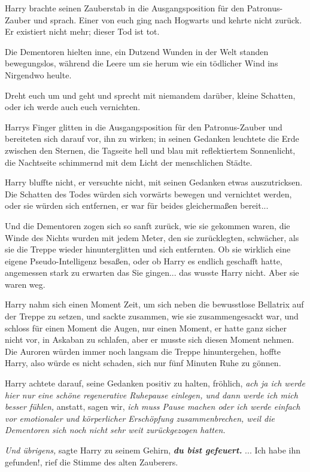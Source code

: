 Harry brachte seinen Zauberstab in die Ausgangsposition für den Patronus-Zauber
und sprach. \glqq{}Einer von euch ging nach Hogwarts und kehrte nicht zurück. Er
existiert nicht mehr; dieser Tod ist tot.\grqq{}

Die Dementoren hielten inne, ein Dutzend Wunden in der Welt standen
bewegungslos, während die Leere um sie herum wie ein tödlicher Wind ins
Nirgendwo heulte.

\glqq{}Dreht euch um und geht und sprecht mit niemandem darüber, kleine Schatten,
oder ich werde auch euch vernichten.\grqq{}

Harrys Finger glitten in die Ausgangsposition für den Patronus-Zauber und
bereiteten sich darauf vor, ihn zu wirken; in seinen Gedanken leuchtete die Erde
zwischen den Sternen, die Tagseite hell und blau mit reflektiertem Sonnenlicht,
die Nachtseite schimmernd mit dem Licht der menschlichen Städte.

Harry bluffte nicht, er versuchte nicht, mit seinen Gedanken etwas
auszutricksen. Die Schatten des Todes würden sich vorwärts bewegen und
vernichtet werden, oder sie würden sich entfernen, er war für beides
gleichermaßen bereit...

Und die Dementoren zogen sich so sanft zurück, wie sie gekommen waren, die Winde
des Nichts wurden mit jedem Meter, den sie zurücklegten, schwächer, als sie die
Treppe wieder hinunterglitten und sich entfernten. Ob sie wirklich eine eigene
Pseudo-Intelligenz besaßen, oder ob Harry es endlich geschafft hatte, angemessen
stark zu erwarten das Sie gingen... das wusste Harry nicht. Aber sie waren weg.

Harry nahm sich einen Moment Zeit, um sich neben die bewusstlose Bellatrix auf
der Treppe zu setzen, und sackte zusammen, wie sie zusammengesackt war, und
schloss für einen Moment die Augen, nur einen Moment, er hatte ganz sicher nicht
vor, in Askaban zu schlafen, aber er musste sich diesen Moment nehmen. Die
Auroren würden immer noch langsam die Treppe hinuntergehen, hoffte Harry, also
würde es nicht schaden, sich nur fünf Minuten Ruhe zu gönnen.

Harry achtete darauf, seine Gedanken positiv zu halten, fröhlich, \emph{ach ja
ich werde hier nur eine schöne regenerative Ruhepause einlegen, und dann werde
ich mich besser fühlen,} anstatt, sagen wir, \emph{ich muss Pause machen oder
ich werde einfach vor emotionaler und körperlicher Erschöpfung zusammenbrechen,
weil die Dementoren sich noch nicht sehr weit zurückgezogen hatten.}

\emph{Und übrigens,} sagte Harry zu seinem Gehirn, \textbf{\emph{du bist
gefeuert.} }
\textbf{}
\textbf{}
... \glqq{}Ich habe ihn gefunden!\grqq{}, rief die Stimme des alten Zauberers.

